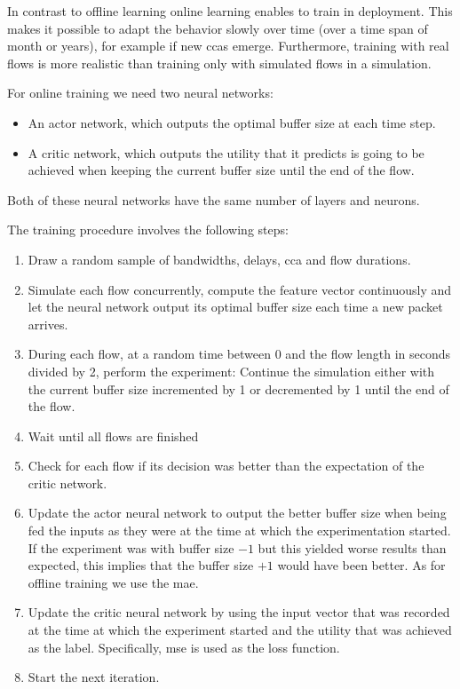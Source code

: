\documentclass[10pt,sigconf,letterpaper,anonymous]{acmart}
\begin{document}
In contrast to offline learning online learning enables to train in deployment. This makes it possible to adapt the behavior slowly over time (over a time span of month or years), for example if new \glspl{cca} emerge. Furthermore, training with real flows is more realistic than training only with simulated flows in a simulation. 

For online training we need two neural networks: 
\begin{itemize}
\item An actor network, which outputs the optimal buffer size at each time step.
\item A critic network, which outputs the utility that it predicts is going to be achieved when keeping the current buffer size until the end of the flow. 
\end{itemize}
Both of these neural networks have the same number of layers and neurons. 

The training procedure involves the following steps:
\begin{enumerate}
\item Draw a random sample of bandwidths, delays, \gls{cca} and flow durations.
\item Simulate each flow concurrently, compute the feature vector continuously and let the neural network output its optimal buffer size each time a new packet arrives. 
\item During each flow, at a random time between 0 and the flow length in seconds divided by 2, perform the experiment: Continue the simulation either with the current buffer size incremented by 1 or decremented by 1 until the end of the flow. 
\item Wait until all flows are finished
\item Check for each flow if its decision was better than the expectation of the critic network.
\item Update the actor neural network to output the better buffer size when being fed the inputs as they were at the time at which the experimentation started. If the experiment was with buffer size $-1$ but this yielded worse results than expected, this implies that the buffer size $+1$ would have been better. As for offline training we use the \gls{mae}. 
\item Update the critic neural network by using the input vector that was recorded at the time at which the experiment started and the utility that was achieved as the label. Specifically, \gls{mse} is used as the loss function. 
\item Start the next iteration. 
\end{enumerate}
\end{document}

